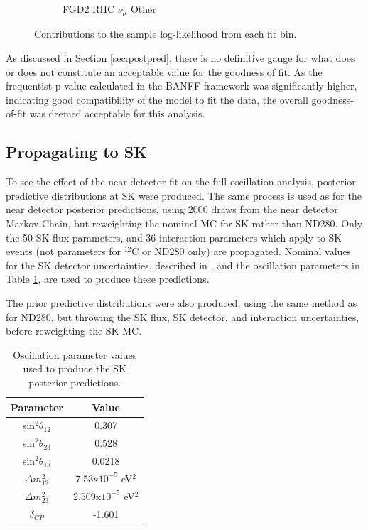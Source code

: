 \begin{figure}
\begin{subfigure}{.32\textwidth}
  \caption{FGD2 RHC $\nu_{\mu}$ Other}
  \label{fig:llhcont_FGD2_NuMuBkg_CCOther_in_AntiNu_Mode}
\end{subfigure}
\caption{Contributions to the sample log-likelihood from each fit bin.}
\label{fig:llhconts}
\end{figure}

As discussed in Section \ref{sec:postpred}, there is no definitive gauge for what does or does not constitute an acceptable value for the goodness of fit. As the frequentist p-value calculated in the BANFF framework was significantly higher\cite{}, indicating good compatibility of the model to fit the data, the overall goodness-of-fit was deemed acceptable for this analysis.

\subsection{Propagating to SK}

To see the effect of the near detector fit on the full oscillation analysis, posterior predictive distributions at SK were produced. The same process is used as for the near detector posterior predictions, using 2000 draws from the near detector Markov Chain, but reweighting the nominal MC for SK rather than ND280. Only the 50 SK flux parameters, and 36 interaction parameters which apply to SK events (not parameters for $^{12}$C or ND280 only) are propagated. Nominal values for the SK detector uncertainties, described in \cite{}, and the oscillation parameters in Table \ref{tab:oscpar}, are used to produce these predictions.

The prior predictive distributions were also produced, using the same method as for ND280, but throwing the SK flux, SK detector, and interaction uncertainties, before reweighting the SK MC.

\begin{center}
\begin{table}
\center
\begin{tabular}{c||c}
\hline \hline
\textbf{Parameter} & \textbf{Value} \\
\hline\hline
sin$^2 \theta_{12}$ & 0.307 \\ 
sin$^2 \theta_{23}$ & 0.528 \\
sin$^2 \theta_{13}$ & 0.0218 \\
$\Delta m^2_{12}$ & 7.53x$10^{-5}$ eV$^2$\\ 
$\Delta m^2_{23}$ & 2.509x$10^{-5}$ eV$^2$ \\ 
$\delta_{CP}$ & -1.601 \\ 
\hline \hline
\end{tabular}
\caption{Oscillation parameter values used to produce the SK posterior predictions.}
\label{tab:oscpar}
\end{table}
\end{center}

